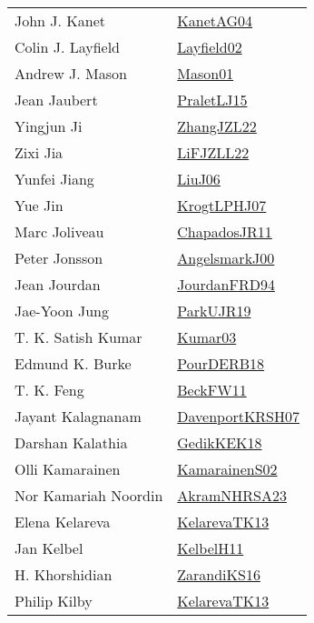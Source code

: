 {\begin{longtable}{p{4cm}p{20cm}}
John J. Kanet & \href{}{KanetAG04}\cite{KanetAG04} \\
Colin J. Layfield & \href{}{Layfield02}\cite{Layfield02} \\
Andrew J. Mason & \href{articles/Mason01.pdf}{Mason01}\cite{Mason01} \\
Jean Jaubert & \href{papers/PraletLJ15.pdf}{PraletLJ15}\cite{PraletLJ15} \\
Yingjun Ji & \href{papers/ZhangJZL22.pdf}{ZhangJZL22}\cite{ZhangJZL22} \\
Zixi Jia & \href{papers/LiFJZLL22.pdf}{LiFJZLL22}\cite{LiFJZLL22} \\
Yunfei Jiang & \href{papers/LiuJ06.pdf}{LiuJ06}\cite{LiuJ06} \\
Yue Jin & \href{papers/KrogtLPHJ07.pdf}{KrogtLPHJ07}\cite{KrogtLPHJ07} \\
Marc Joliveau & \href{papers/ChapadosJR11.pdf}{ChapadosJR11}\cite{ChapadosJR11} \\
Peter Jonsson & \href{papers/AngelsmarkJ00.pdf}{AngelsmarkJ00}\cite{AngelsmarkJ00} \\
Jean Jourdan & \href{}{JourdanFRD94}\cite{JourdanFRD94} \\
Jae{-}Yoon Jung & \href{papers/ParkUJR19.pdf}{ParkUJR19}\cite{ParkUJR19} \\
T. K. Satish Kumar & \href{papers/Kumar03.pdf}{Kumar03}\cite{Kumar03} \\
Edmund K. Burke & \href{articles/PourDERB18.pdf}{PourDERB18}\cite{PourDERB18} \\
T. K. Feng & \href{}{BeckFW11}\cite{BeckFW11} \\
Jayant Kalagnanam & \href{papers/DavenportKRSH07.pdf}{DavenportKRSH07}\cite{DavenportKRSH07} \\
Darshan Kalathia & \href{articles/GedikKEK18.pdf}{GedikKEK18}\cite{GedikKEK18} \\
Olli Kamarainen & \href{papers/KamarainenS02.pdf}{KamarainenS02}\cite{KamarainenS02} \\
Nor Kamariah Noordin & \href{articles/AkramNHRSA23.pdf}{AkramNHRSA23}\cite{AkramNHRSA23} \\
Elena Kelareva & \href{papers/KelarevaTK13.pdf}{KelarevaTK13}\cite{KelarevaTK13} \\
Jan Kelbel & \href{articles/KelbelH11.pdf}{KelbelH11}\cite{KelbelH11} \\
H. Khorshidian & \href{articles/ZarandiKS16.pdf}{ZarandiKS16}\cite{ZarandiKS16} \\
Philip Kilby & \href{papers/KelarevaTK13.pdf}{KelarevaTK13}\cite{KelarevaTK13} \\

\end{longtable}}
